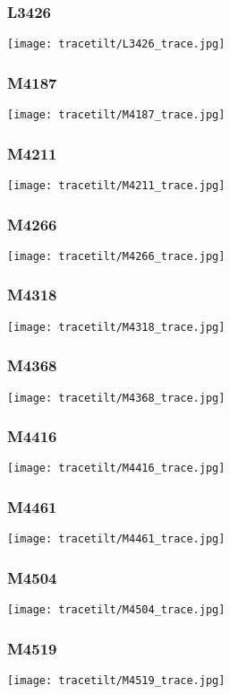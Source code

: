 \subsubsection{L3426}
\texttt{[image: tracetilt/L3426\_trace.jpg]}


\subsubsection{M4187}
\texttt{[image: tracetilt/M4187\_trace.jpg]}
\subsubsection{M4211}
\texttt{[image: tracetilt/M4211\_trace.jpg]}
\subsubsection{M4266}
\texttt{[image: tracetilt/M4266\_trace.jpg]}
\subsubsection{M4318}
\texttt{[image: tracetilt/M4318\_trace.jpg]}
\subsubsection{M4368}
\texttt{[image: tracetilt/M4368\_trace.jpg]}
\subsubsection{M4416}
\texttt{[image: tracetilt/M4416\_trace.jpg]}
\subsubsection{M4461}
\texttt{[image: tracetilt/M4461\_trace.jpg]}
\subsubsection{M4504}
\texttt{[image: tracetilt/M4504\_trace.jpg]}
\subsubsection{M4519}
\texttt{[image: tracetilt/M4519\_trace.jpg]}

